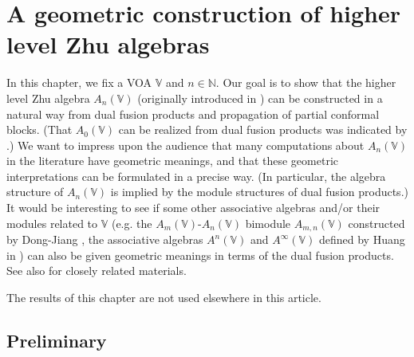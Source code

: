 \documentclass[11pt,b5paper,notitlepage]{article}
\theoremstyle{definition}
\theoremstyle{plain}
\newcommand{\Vbb}{\mathbb V}
\newcommand{\Nbb}{\mathbb N}
\newcommand{\<}{\left\langle}
\renewcommand{\>}{\right\rangle}
\numberwithin{equation}{subsection}
\begin{document}
\section{A geometric construction of higher level Zhu algebras}\label{lb87}


In this chapter, we fix a VOA $\Vbb$ and $n\in \Nbb$.  Our goal is to show that the higher level Zhu algebra $A_n(\Vbb)$ (originally introduced in \cite{Zhu-modular-invariance,DLM-Zhu}) can be constructed in a natural way from dual fusion products and propagation of partial conformal blocks. (That $A_0(\Vbb)$ can be realized from dual fusion products was indicated by \cite[Prop. 7.2.2 and A.2.7]{NT-P1_conformal_blocks}.) We want to impress upon the audience that many computations about $A_n(\Vbb)$ in the literature have geometric meanings, and that these geometric interpretations can be formulated in a precise way. (In particular, the algebra structure of $A_n(\Vbb)$ is implied by the module structures of dual fusion products.) It would be interesting to see if some other associative algebras and/or their modules related to $\Vbb$ (e.g. the $A_m(\Vbb)$-$A_n(\Vbb)$ bimodule $A_{m,n}(\Vbb)$ constructed by Dong-Jiang \cite{DJ-bimodules}, the associative algebras $A^n(\Vbb)$ and $A^\infty(\Vbb)$ defined by Huang in \cite{Hua-associative}) can also be given geometric meanings in terms of the dual fusion products. See also \cite{Li-regular-Zhu,Li-regular-AnV,Li-regular-bimodules} for closely related materials.


The results of this chapter are not used elsewhere in this article.


\subsection{Preliminary}
\end{document}
